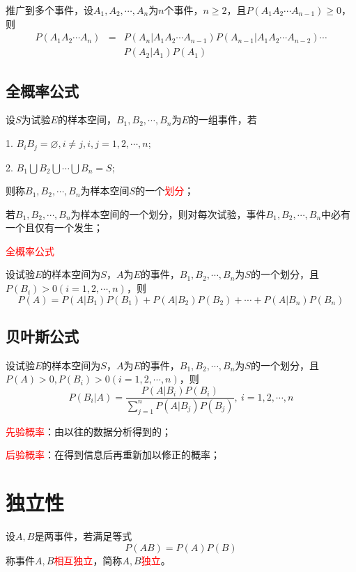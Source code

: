 \documentclass[12pt,a4paper]{article}
\begin{document}
推广到多个事件，设$A_1, A_2, \cdots, A_n$为$n$个事件，$n \geqslant 2$，且$P(A_1 A_2 \cdots A_{n-1}) \geqslant 0$，则
\begin{eqnarray}
\nonumber P(A_1 A_2 \cdots A_{n}) &=& P(A_n|A_1 A_2 \cdots A_{n-1}) P(A_{n-1}|A_1 A_2 \cdots A_{n-2}) \cdots \\
&& P(A_2|A_1) P(A_1)
\end{eqnarray}


\subsection{全概率公式}
设$S$为试验$E$的样本空间，$B_1, B_2, \cdots, B_n$为$E$的一组事件，若

1. $B_iB_j = \varnothing, i \neq j, i, j = 1, 2, \cdots, n$;

2. $B_1 \bigcup B_2 \bigcup \cdots \bigcup B_n = S$;

则称$B_1, B_2, \cdots, B_n$为样本空间$S$的一个\textcolor{red}{划分}；

若$B_1, B_2, \cdots, B_n$为样本空间的一个划分，则对每次试验，事件$B_1, B_2, \cdots, B_n$中必有一个且仅有一个发生；

\textcolor{red}{全概率公式}

设试验$E$的样本空间为$S$，$A$为$E$的事件，$B_1, B_2, \cdots, B_n$为$S$的一个划分，且$P(B_i) > 0 (i = 1, 2, \cdots, n)$，则
\begin{equation}
P(A) = P(A|B_1) P(B_1) + P(A|B_2) P(B_2) + \cdots +P(A|B_n) P(B_n)
\end{equation}


\subsection{贝叶斯公式}
设试验$E$的样本空间为$S$，$A$为$E$的事件，$B_1, B_2, \cdots, B_n$为$S$的一个划分，且$P(A) > 0, P(B_i) > 0 (i = 1, 2, \cdots, n)$，则
\begin{equation}
P(B_i|A) = \frac{P(A|B_i)P(B_i)}{\sum\limits_{j=1}^n P(A|B_j)P(B_j)}, ~i =1, 2, \cdots, n
\end{equation}


\textcolor{red}{先验概率}：由以往的数据分析得到的；

\textcolor{red}{后验概率}：在得到信息后再重新加以修正的概率；

\section{独立性}
设$A, B$是两事件，若满足等式
\begin{equation}
P(AB) = P(A) P(B)
\end{equation}
称事件$A, B$\textcolor{red}{相互独立}，简称$A, B$\textcolor{red}{独立}。
\end{document}
